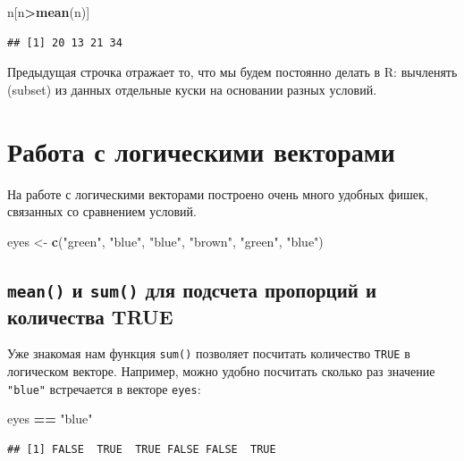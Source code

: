\documentclass[]{book}
\newenvironment{Shaded}{\begin{snugshade}}{\end{snugshade}}
\newcommand{\KeywordTok}[1]{\textcolor[rgb]{0.13,0.29,0.53}{\textbf{#1}}}
\newcommand{\StringTok}[1]{\textcolor[rgb]{0.31,0.60,0.02}{#1}}
\newcommand{\OperatorTok}[1]{\textcolor[rgb]{0.81,0.36,0.00}{\textbf{#1}}}
\newcommand{\NormalTok}[1]{#1}
\begin{document}
\begin{Shaded}
\begin{Highlighting}[]
\NormalTok{n[n}\OperatorTok{>}\KeywordTok{mean}\NormalTok{(n)]}
\end{Highlighting}
\end{Shaded}

\begin{verbatim}
## [1] 20 13 21 34
\end{verbatim}

Предыдущая строчка отражает то, что мы будем постоянно делать в R:
вычленять (subset) из данных отдельные куски на основании разных
условий.

\section{Работа с логическими векторами}\label{logic_vectors}

На работе с логическими векторами построено очень много удобных фишек,
связанных со сравнением условий.

\begin{Shaded}
\begin{Highlighting}[]
\NormalTok{eyes <-}\StringTok{ }\KeywordTok{c}\NormalTok{(}\StringTok{"green"}\NormalTok{, }\StringTok{"blue"}\NormalTok{, }\StringTok{"blue"}\NormalTok{, }\StringTok{"brown"}\NormalTok{, }\StringTok{"green"}\NormalTok{, }\StringTok{"blue"}\NormalTok{)}
\end{Highlighting}
\end{Shaded}

\subsection{\texorpdfstring{\texttt{mean()} и \texttt{sum()} для
подсчета пропорций и количества
TRUE}{mean() и sum() для подсчета пропорций и количества TRUE}}\label{logic_mean_sum}

Уже знакомая нам функция \texttt{sum()} позволяет посчитать количество
\texttt{TRUE} в логическом векторе. Например, можно удобно посчитать
сколько раз значение \texttt{"blue"} встречается в векторе
\texttt{eyes}:

\begin{Shaded}
\begin{Highlighting}[]
\NormalTok{eyes }\OperatorTok{==}\StringTok{ "blue"}
\end{Highlighting}
\end{Shaded}

\begin{verbatim}
## [1] FALSE  TRUE  TRUE FALSE FALSE  TRUE
\end{verbatim}
\end{document}
